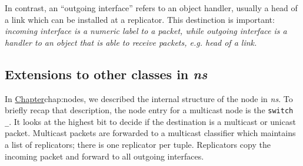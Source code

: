 In contrast, an ``outgoing interface'' refers to an object handler,
usually a head of a link which can be installed at a replicator.  This
destinction is important: \textit{incoming interface is a numeric label to
a packet, while outgoing interface is a handler to an object that is
able to receive packets, e.g. head of a link.}
 
\subsection{Extensions to other classes in \emph{ns}}
In \href{the earlier chapter describing nodes in
\emph{ns}}{Chapter}{chap:nodes}, we described the internal structure of the
node in \emph{ns}.  To briefly recap that description, the node entry for a
multicast node is the
{\tt switch\\_}.  It looks at the highest bit to decide if the
destination is a multicast or unicast packet.  Multicast packets are
forwarded to a multicast classifier which maintains a list of
replicators; there is one replicator per  tuple.
Replicators copy the incoming packet and forward to all outgoing
interfaces.

